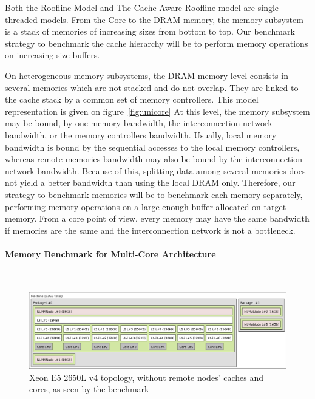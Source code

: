 \documentclass[twoside,twocolumn,8pt]{extarticle}
\begin{document}
Both the Roofline Model and The Cache Aware Roofline model are single threaded models.
From the Core to the DRAM memory, the memory subsystem is a stack of memories of increasing sizes from bottom to top.
Our benchmark strategy to benchmark the cache hierarchy will be to perform memory operations on increasing size buffers.

On heterogeneous memory subsystems, the DRAM memory level consists in several memories which are not stacked and do not
overlap. They are linked to the cache stack by a common set of memory controllers. This model representation is given on
figure~\ref{fig:unicore}
At this level, the memory subsystem may be bound, by one memory bandwidth, the interconnection network bandwidth,
or the memory controllers bandwidth.
Usually, local memory bandwidth is bound by the sequential accesses to the local memory controllers,
whereas remote memories bandwidth may also be bound by the interconnection network bandwidth.
Because of this, splitting data among several memories does not yield a better bandwidth than using the local DRAM only.
Therefore, our strategy to benchmark memories will be to benchmark each memory separately, performing memory operations on a large
enough buffer allocated on target memory.
From a core point of view, every memory may have the same bandwidth if memories are the same and the interconnection
network is not a bottleneck.

\paragraph{Memory Benchmark for Multi-Core Architecture}\mbox{}\\

\begin{figure}
  \centering
  \includegraphics[width=.9\textwidth]{pictures/Xeon_E5_2650L_v4}
  \caption{Xeon E5 2650L v4 topology, without remote nodes' caches and cores, as seen by the benchmark}
  \label{fig:joe0}
\end{figure}
\end{document}
